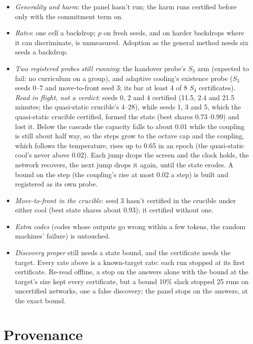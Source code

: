 \documentclass[11pt]{article}
\begin{document}
\begin{itemize}
  \item \emph{Generality and harm}: the panel hasn't run; the harm runs certified before only with
  the commitment term on.
  \item \emph{Rates}: one cell a backdrop; $p$ on fresh seeds, and on harder backdrops where it can
  discriminate, is unmeasured. Adoption as the general method needs six seeds a backdrop.
  \item \emph{Two registered probes still running}: the handover probe's $S_3$ arm (expected to fail:
  no curriculum on a group), and adaptive cooling's existence probe ($S_3$ seeds 0--7 and
  move-to-front seed 3; its bar at least 4 of 8 $S_3$ certificates). \emph{Read in flight, not a
  verdict}: seeds 0, 2 and 4 certified (11.5, 2.4 and 21.5 minutes; the quasi-static crucible's 4--28),
  while seeds 1, 3 and 5, which the quasi-static crucible certified, formed the state (best shares
  0.73--0.99) and lost it. Below the cascade the capacity falls to about 0.01 while the coupling is
  still about half way, so the steps grow to the octave cap and the coupling, which follows the
  temperature, rises up to 0.65 in an epoch (the quasi-static cool's never above 0.02). Each jump drops
  the screen and the clock holds, the network recovers, the next jump drops it again, until the state
  erodes. A bound on the step (the coupling's rise at most 0.02 a step) is built and registered as
  its own probe.
  \item \emph{Move-to-front in the crucible}: seed 3 hasn't certified in the crucible under either
  cool (best state shares about 0.93); it certified without one.
  \item \emph{Extra codes} (codes whose outputs go wrong within a few tokens, the random machines'
  failure) is untouched.
  \item \emph{Discovery proper} still needs a state bound, and the certificate needs the target. Every
  rate above is a known-target rate: each run stopped at its first certificate. Re-read offline, a
  stop on the answers alone with the bound at the target's size kept every certificate, but a bound
  10\% slack stopped 25 runs on uncertified networks, one a false discovery; the panel stops on the answers, at the exact bound.
\end{itemize}

\section{Provenance}
\label{sec:provenance}
\end{document}
